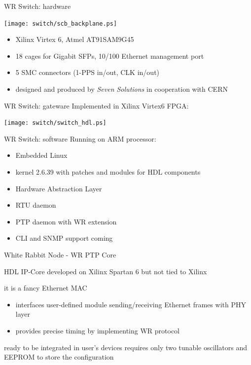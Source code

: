 \documentclass[compress,red]{beamer}
\begin{document}
\begin{frame}{WR Switch: hardware}
	\begin{center}
	\texttt{[image: switch/scb\_backplane.ps]}
	\end{center}
	\begin{itemize}
	\item Xilinx Virtex 6, Atmel AT91SAM9G45
	\item 18 cages for Gigabit SFPs, 10/100 Ethernet management port
	\item 5 SMC connectors (1-PPS in/out, CLK in/out)
	\item designed and produced by \emph{Seven Solutions} in cooperation with CERN
	\end{itemize}
\end{frame}

\begin{frame}{WR Switch: gateware}
	Implemented in Xilinx Virtex6 FPGA:
	\begin{center}
	\texttt{[image: switch/switch\_hdl.ps]}
	\end{center}
\end{frame}

\begin{frame}{WR Switch: software}
	Running on ARM processor:
	\begin{itemize}
	\item Embedded Linux
	\item kernel 2.6.39 with patches and modules for HDL components
	\item Hardware Abstraction Layer
	\item RTU daemon
	\item PTP daemon with WR extension
	\item CLI and SNMP support coming
	\end{itemize}
\end{frame}

\begin{frame}{White Rabbit Node - WR PTP Core}
	\begin{block}{HDL IP-Core}
	developed on Xilinx Spartan 6 but not tied to Xilinx
	\end{block}
	\begin{block}{it is a fancy Ethernet MAC}
	\begin{itemize}
	\item interfaces user-defined module sending/receiving Ethernet frames with PHY layer
	\item provides precise timing by implementing WR protocol
	\end{itemize}
	\end{block}
	\begin{block}{ready to be integrated in user's devices}
	requires only two tunable oscillators and EEPROM to store the configuration
	\end{block}
\end{frame}
\end{document}
